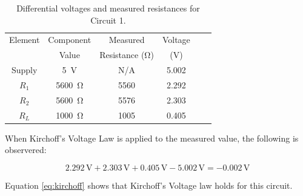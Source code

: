 \documentclass[11pt]{article}
\begin{document}
\begin{table}[h!]
	\caption{Differential voltages and measured resistances for Circuit 1.}
	\label{Table:DerivedResultsCircuit1}
	\begin{center}
		\begin{tabular}{|c||c|c|c|c|c|}
			\hline
			Element & Component & Measured & Voltage  \\
			& Value & Resistance (\si{\ohm}) & (\si{\volt})     \\
	
			\hline
			Supply & 5~\si{\volt} & N/A & 5.002 \\	 
			\hline 
			$R_1$ & 5600~\si{\ohm} & 5560 & 2.292 \\	 
			\hline
			$R_2$ & 5600~\si{\ohm} & 5576 & 2.303 \\
			\hline
			$R_L$ & 1000~\si{\ohm} & 1005 & 0.405 \\
			\hline
		\end{tabular}
	\end{center}
\end{table}

When Kirchoff's Voltage Law is applied to the measured value, the following is observered:

\begin{equation}
\label{eq:kirchoff}
2.292\,\si\volt + 2.303\,\si\volt + 0.405\,\si\volt - 5.002\,\si\volt = -0.002\,\si\volt
\end{equation}

Equation \ref{eq:kirchoff} shows that Kirchoff's Voltage law holds for this circuit.
\end{document}
